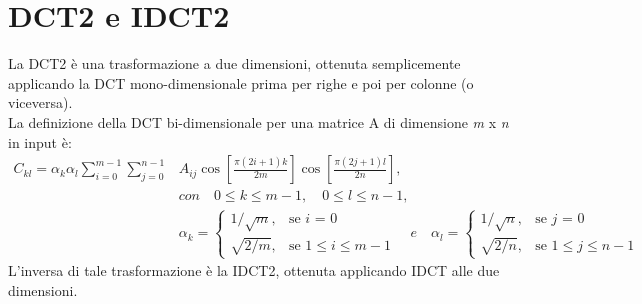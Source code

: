 \documentclass[a4paper,12pt]{report}
\begin{document}
\section{DCT2 e IDCT2}
La DCT2 è una trasformazione a due dimensioni, ottenuta semplicemente applicando la DCT mono-dimensionale prima per righe e poi per colonne (o viceversa).\\
La definizione della DCT bi-dimensionale per una matrice A di dimensione \textit{m} x \textit{n} in input è:\\
\begin{align*}
C_{kl} = \alpha_k \alpha_l \sum_{i=0}^{m-1} \sum_{j=0}^{n-1}&A_{ij} \cos \left[\frac{\pi \left(2i + 1\right) k }{2m}\right] \cos \left[\frac{\pi \left(2j + 1\right) l }{2n}\right],\\
&con \quad 0 \leq k \leq m - 1, \quad 0 \leq l \leq n - 1,\\
&\alpha_k = \begin{cases} 1/\sqrt{m}, & \mbox{se } i\mbox{ = 0} \\ \sqrt{2/m}, & \mbox{se } \mbox{\(1 \leq i \leq m - 1\)} \end{cases} \quad e \quad \alpha_l = \begin{cases} 1/\sqrt{n}, & \mbox{se } j\mbox{ = 0} \\ \sqrt{2/n}, & \mbox{se } \mbox{\(1 \leq j \leq n - 1\)} \end{cases}
\end{align*}
L'inversa di tale trasformazione è la IDCT2, ottenuta applicando IDCT alle due dimensioni.
\end{document}
